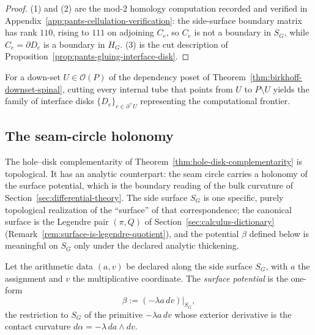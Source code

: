 \begin{proof}
(1) and (2) are the mod-$2$ homology computation recorded and verified in
Appendix~\ref{app:pants-cellulation-verification}: the side-surface boundary
matrix has rank $110$, rising to $111$ on adjoining $C_e$, so $C_e$ is not a
boundary in $S_G$, while $C_e=\partial D_e$ is a boundary in $H_G$.  (3) is the
cut description of Proposition~\ref{prop:pants-gluing-interface-disk}.
\end{proof}

\begin{remark}
\label{rem:downset-frontier-disks}
For a down-set $U\in\mathcal O(P)$ of the dependency poset of
Theorem~\ref{thm:birkhoff-downset-spinal}, cutting every internal tube that
points from $U$ to $P\setminus U$ yields the family of interface disks
$\{D_e\}_{e\in\partial^+U}$ representing the computational frontier.
\end{remark}

\subsection{The seam-circle holonomy}

The hole--disk complementarity of
Theorem~\ref{thm:hole-disk-complementarity} is topological.  It has an analytic
counterpart: the seam circle carries a holonomy of the surface potential, which
is the boundary reading of the bulk curvature of
Section~\ref{sec:differential-theory}.  The side surface $S_G$ is one specific,
purely topological realization of the ``surface'' of that correspondence; the
canonical surface is the Legendre pair $(\pi,Q)$ of
Section~\ref{sec:calculus-dictionary}
(Remark~\ref{rem:surface-is-legendre-quotient}), and the potential $\beta$
defined below is meaningful on $S_G$ only under the declared analytic thickening.

\begin{definition}
\label{def:surface-potential}
Let the arithmetic data $(a,v)$ be declared along the side surface $S_G$, with
$a$ the assignment and $v$ the multiplicative coordinate.  The \emph{surface
potential} is the one-form
\[
  \beta:=(-\lambda a\,dv)\big|_{S_G},
\]
the restriction to $S_G$ of the primitive $-\lambda a\,dv$ whose exterior
derivative is the contact curvature $d\alpha=-\lambda\,da\wedge dv$.
\end{definition}

